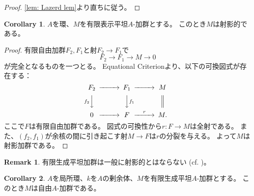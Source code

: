 \documentclass[uplatex]{jsarticle}
\theoremstyle{definition}
\newtheorem{cor}[cor]{Corollary}
\newtheorem{rem}[rem]{Remark}
\theoremstyle{plain}
\begin{document}
\begin{proof}
  \autoref{lem: Lazerd lem}より直ちに従う。
\end{proof}


\begin{cor}
  \(A\)を環、\(M\)を有限表示平坦\(A\)-加群とする。
  このとき\(M\)は射影的である。
\end{cor}

\begin{proof}
  有限自由加群\(F_2,F_1\)と射\(F_2\to F_1\)で
  \[
  F_2\to F_1\to M\to 0
  \]
  が完全となるものを一つとる。
  Equational Criterionより、以下の可換図式が存在する：
  \[
  \begin{CD}
    F_2 @>>> F_1 @>>> M \\
    @Vf_2VV @VVf_1V @| \\
    0 @>>> F @>r>> M.
  \end{CD}
  \]
  ここで\(F\)は有限自由加群である。
  図式の可換性から\(r:F\to M\)は全射である。
  また、\((f_2,f_1)\)が余核の間に引き起こす射\(M\to F\)は\(r\)の分裂を与える。
  よって\(M\)は射影加群である。
\end{proof}


\begin{rem}
  有限生成平坦加群は一般に射影的とはならない
  (cf. \cite[\href{https://stacks.math.columbia.edu/tag/00NY}{Tag 00NY}]{stacks-project})。
\end{rem}



\begin{cor}\label{cor: fg flat over local is free}
  \(A\)を局所環、\(k\)を\(A\)の剰余体、\(M\)を有限生成平坦\(A\)-加群とする。
  このとき\(M\)は自由\(A\)-加群である。
\end{cor}
\end{document}
